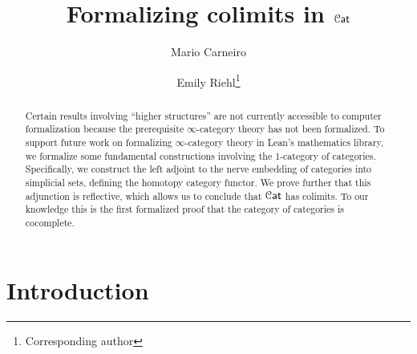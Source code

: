\documentclass[a4paper,UKenglish,cleveref, autoref, thm-restate]{lipics-v2021}
\title{Formalizing colimits in $\Cat$}
\author{Mario Carneiro}{Chalmers University of Technology, Sweden} {marioc@chalmers.se}{https://orcid.org/0000-0002-0470-5249}{}%
\author{Emily Riehl\footnote{Corresponding author}}{Department of Mathematics, Johns Hopkins University, 3400 N Charles Street, Baltimore, MD, USA }{eriehl@jhu.edu}{https://orcid.org/0000-0002-8465-8859}{NSF DMS-1652600, AFOSR FA9550-21-1-0009, ARO W911NF-20-1-0082}
\newcommand{\cat}[1]{\textup{\textsf{#1}}}%
\newcommand{\1}{\mathbbe{1}}
\newcommand{\2}{\mathbbe{2}}
\newcommand{\3}{\mathbbe{3}}
\newcommand{\Cat}{\mathcal{C}\cat{at}}
\begin{document}
\maketitle

\begin{abstract}
  Certain results involving ``higher structures'' are not currently accessible to computer formalization because the prerequisite $\infty$-category theory has not been formalized. To support future work on formalizing $\infty$-category theory in Lean's mathematics library, we formalize some fundamental constructions involving the 1-category of categories. Specifically, we construct the left adjoint to the nerve embedding of categories into simplicial sets, defining the homotopy category functor. We prove further that this adjunction is reflective, which allows us to conclude that $\Cat$ has colimits. To our knowledge this is the first formalized proof that the category of categories is cocomplete.




\end{abstract}

\maketitle

\tableofcontents

\section{Introduction}
\end{document}
